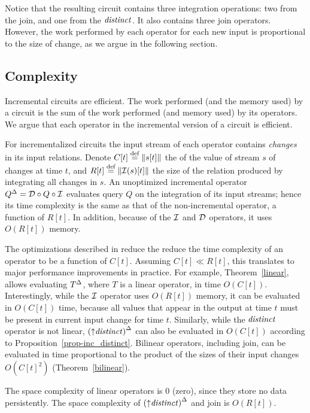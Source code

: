 Notice that the resulting circuit contains three integration operations: two from
the join, and one from the $\mathit{distinct}$.  It also contains three join operators.
However, the work performed by each operator
for each new input is proportional to the size of change, as we argue in the following section.

\subsection{Complexity}

Incremental circuits are efficient.  The work performed (and the memory used) by a circuit
is the sum of the work performed (and memory used) by its operators.
We argue that each operator in the incremental version of a circuit is efficient.

For incrementalized circuits the input stream of each operator contains \emph{changes} in
its input relations.  Denote $C[t] \stackrel{\textrm{\scriptsize def}}{=} \| s[t] \|$ the 
of the value of stream $s$ of changes at time $t$, and $R[t] \stackrel{\textrm{\scriptsize def}}{=}
\| \mathcal{I}(s)[t] \|$ the size of the relation produced by integrating all changes in
$s$.  An unoptimized incremental operator ${Q}^{\Delta} = \mathcal{D} \circ Q \circ \mathcal{I}$
evaluates query $Q$ on the integration of its input streams; hence its time
complexity  is the same as that of the non-incremental operator, a function of
$R[t]$.  In addition, because of the $\mathcal{I}$ and $\mathcal{D}$ operators, it uses $O(R[t])$ memory.

The optimizations described in  reduce the
reduce the time complexity of an operator to be a function of $C[t]$.  Assuming $C[t] \ll
R[t]$, this translates to major performance improvements in practice.  For
example, Theorem~\ref{linear}, allows evaluating ${T}^{\Delta}$, where $T$ is a
linear operator, in time $O(C[t])$.  Interestingly, while the $\mathcal{I}$
operator uses $O(R[t])$ memory, it can be evaluated in $O(C[t])$ time, because 
all values that appear in the output at time $t$ must be present in
current input change for time $t$.  Similarly, while the $\mathit{distinct}$ operator is not
linear, ${({\uparrow}\mathit{distinct})}^{\Delta}$ can also be evaluated in $O(C[t])$ according to
Proposition~\ref{prop-inc_distinct}.  Bilinear operators, including join, can be
evaluated in time proportional to the product of the sizes of their input
changes $O(C[t]^2)$ (Theorem~\ref{bilinear}).  

The space complexity of linear operators is 0 (zero), since they store no
data persistently.  The space complexity of ${({\uparrow}\mathit{distinct})}^{\Delta}$ and 
join is $O(R[t])$.